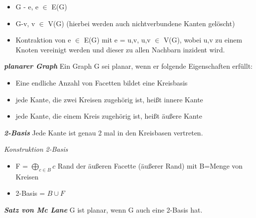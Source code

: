 \begin{itemize}
	\item G - e, e $\in$ E(G)
	\item G-v, v $\in$ V(G) (hierbei werden auch nichtverbundene Kanten gelöscht)
	\item Kontraktion von e $\in$ E(G) mit e = {u,v}, u,v $\in$ V(G), wobei u,v zu einem Knoten vereinigt werden und dieser zu allen Nachbarn inzident wird.
\end{itemize}
\textbf{\textit{planarer Graph}} \newline
Ein Graph G sei planar, wenn er folgende Eigenschaften erfüllt: 
\begin{itemize}
	\item Eine endliche Anzahl von Facetten bildet eine Kreisbasis
	\item jede Kante, die zwei Kreisen zugehörig ist, heißt innere Kante
	\item jede Kante, die einem Kreis zugehörig ist, heißt äußere Kante
\end{itemize}
\textbf{\textit{2-Basis}}\newline
Jede Kante ist genau 2 mal in den Kreisbasen vertreten.\newline
 
\textit{Konstruktion 2-Basis}
\begin{itemize}
	\item F = $\bigoplus\limits_{c \in B} c$ Rand der äußeren Facette (äußerer Rand) mit B=Menge von Kreisen
	\item 2-Basis = $B \cup F$ 
\end{itemize}

\newpage
\textbf{\textit{Satz von Mc Lane}}\newline
G ist planar, wenn G auch eine 2-Basis hat.

